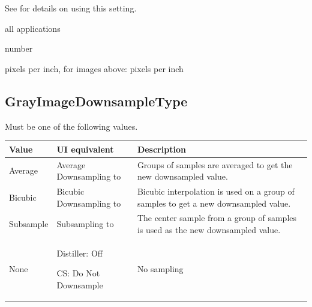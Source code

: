 \documentclass[letterpaper,12pt,english,openany,oneside]{sphinxmanual}
\begin{document}
See  for details on using this setting.

\label{\detokenize{PDF_Create_CommonSettings:supported-by-45}}

all applications

\label{\detokenize{PDF_Create_CommonSettings:type-45}}

number

\label{\detokenize{PDF_Create_CommonSettings:ui-name-33}}

pixels per inch, for images above:  pixels per inch

\label{\detokenize{PDF_Create_CommonSettings:default-value-41}}

\begin{sphinxVerbatim}[commandchars=\\\{\}]
\end{sphinxVerbatim}




\subsection{GrayImageDownsampleType}
\label{\detokenize{PDF_Create_CommonSettings:grayimagedownsampletype}}
Must be one of the following values.


\begin{savenotes}\sphinxattablestart
\centering
{}\label{\detokenize{PDF_Create_CommonSettings:section-8}}\nobreak
\begin{tabulary}{\linewidth}[t]{|T|T|T|}
\hline
\sphinxstyletheadfamily 
Value
&\sphinxstyletheadfamily 
UI equivalent
&\sphinxstyletheadfamily 
Description
\\
\hline
Average
&
Average Downsampling to
&
Groups of samples are averaged to get the new downsampled value.
\\
\hline
Bicubic
&
Bicubic Downsampling to
&
Bicubic interpolation is used on a group of samples to get a new downsampled value.
\\
\hline
Subsample
&
Subsampling to
&
The center sample from a group of samples is used as the new downsampled value.
\\
\hline
None
&
Distiller: Off

CS: Do Not Downsample
&
No sampling
\\
\hline
\end{tabulary}
\par
\sphinxattableend\end{savenotes}
\label{\detokenize{PDF_Create_CommonSettings:supported-by-46}}
\end{document}
